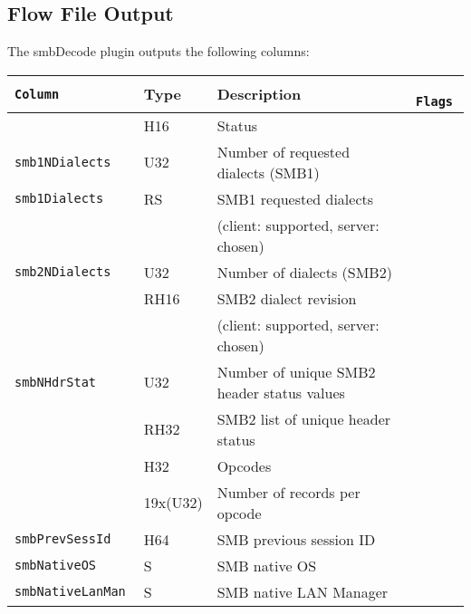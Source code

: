 \documentclass[documentation]{subfiles}
\begin{document}
\subsection{Flow File Output}
The smbDecode plugin outputs the following columns:
\begin{longtable}{>{\tt}lll>{\tt\small}l}
    \toprule
    {\bf Column}                                    & {\bf Type}    & {\bf Description}                          & {\bf Flags}\\
    \midrule\endhead%
    \nameref{smbStat}                               & H16           & Status                                     & \\
    smb1NDialects                                   & U32           & Number of requested dialects (SMB1)        & \\
    smb1Dialects                                    & RS            & SMB1 requested dialects                    & \\
                                                    &               & (client: supported, server: chosen)        & \\
    smb2NDialects                                   & U32           & Number of dialects (SMB2)                  & \\
    \nameref{smb2Dialects}                          & RH16          & SMB2 dialect revision                      & \\
                                                    &               & (client: supported, server: chosen)        & \\
    smbNHdrStat                                     & U32           & Number of unique SMB2 header status values & \\
    \nameref{smbHdrStat}                            & RH32          & SMB2 list of unique header status          & \\
    \nameref{smbOpcodes}                            & H32           & Opcodes                                    & \\
    \nameref{smbNOpcodes}                           & 19x(U32)      & Number of records per opcode               & \\
    smbPrevSessId                                   & H64           & SMB previous session ID                    & \\
    smbNativeOS                                     & S             & SMB native OS                              & \\
    smbNativeLanMan                                 & S             & SMB native LAN Manager                     & \\

\end{longtable}
\end{document}
